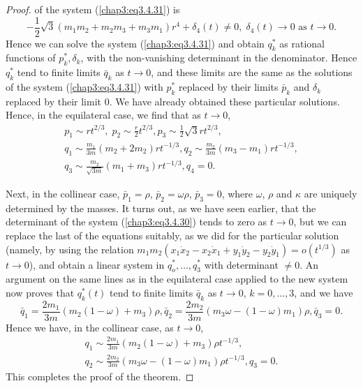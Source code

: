 \begin{proof}
of the system (\ref{chap3:eq3.4.31}) is  
$$
-\frac{1}{2 } \sqrt{3} (m_1 m_2 + m_2 m_3 + m_3 m_1) r^4 + \delta_4(t)
\neq 0, \; \delta_4 (t)  \to 0 \text{ as } t \to 0. 
$$
Hence we can solve the system (\ref{chap3:eq3.4.31}) and obtain
$q^*_k$ as rational functions of $p^*_k, \delta_k$, with the
non-vanishing determinant in the  denominator. Hence $q^*_k$ tend to
finite limits $\bar{q}_k$ as $t \to 0$, and these limits are the same
as the solutions of the system (\ref{chap3:eq3.4.31}) with $p^*_k$
replaced by their limits $\bar{p}_k$ and $\delta_k$ replaced by their
limit 0. We have already obtained these particular solutions. Hence,
in the equilateral case, we find that as $t \to 0$, 
\begin{gather*}
p_1 \sim rt^{2/3}, \; p_2 \sim \frac{r}{2} t^{2/3}, p_3 \sim
\frac{1}{2} \sqrt{3} r t^{2/3},\\ 
q_1 \sim\frac{m_1}{3m} (m_2 + 2m_2) rt^{-1/3}, q_2 \sim \frac{m_2}{3m}
(m_3 - m_1) rt^{-1/3},\\  
q_3 \sim \frac{m_2}{\sqrt{3m}} (m_1 + m_3) rt^{-1/3} , q_4 = 0. 
\end{gather*}
 
Next, in the collinear case, $\bar{p}_1 = \rho$, $\bar{p}_2 = \omega
\rho$, $\bar{p}_3 = 0$, where $\omega$, $\rho$ and $\kappa$ are
uniquely determined by the masses. It turns out, as we have seen
earlier, that the determinant of the system (\ref{chap3:eq3.4.30})
tends to zero as $t \to 0$, but we can replace the last of the
equations suitably, as we did for the particular solution (namely, by
using the relation $m_1m_2(x_1 \dot{x}_2 - x_2 \dot{x}_1 + y_1
\dot{y}_2 - y_2 \dot{y}_1) = o(t^{1/3})$ as $t \to 0$), and obtain a
linear system in $q^*_o, \ldots, q^*_3$ with determinant $\neq 0$. An
argument on the same lines as in the equilateral case applied to the
new system now proves that $q^*_k(t)$ tend to finite limits
$\bar{q}_k$ as $t \to 0$, $k = 0, \ldots, 3$, and we have 
$$
\bar{q}_1 = \frac{2m_1}{3m} (m_2 (1-\omega) + m_3) \rho, \bar{q}_2 =
\frac{2m_2}{3m} (m_3 \omega - (1-\omega) m_1) \rho, \bar{q}_3 = 0. 
$$\pageoriginale
Hence we have, in the collinear case, as $t \to 0$,
\begin{gather*}
q_1 \sim \frac{2m_1}{3m} (m_2 (1 - \omega) + m_3) \rho t^{-1/3},\\ 
q_2 \sim\frac{2m_2}{3m} (m_3 \omega - (1-\omega) m_1) \rho t^{-1/3}, q_3 = 0. 
\end{gather*}
This completes the proof of the theorem.
\end{proof}

